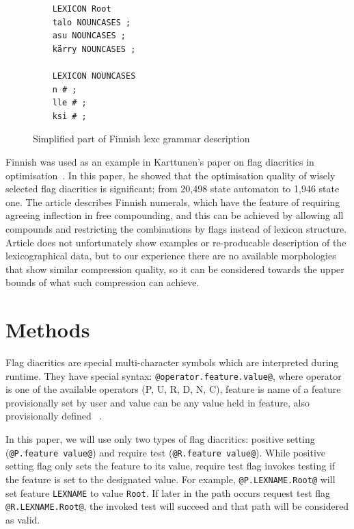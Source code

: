 \documentclass[11pt]{article}
\begin{document}
\begin{figure}
    \centering
    \begin{verbatim}
    LEXICON Root
    talo NOUNCASES ;
    asu NOUNCASES ;
    kärry NOUNCASES ;

    LEXICON NOUNCASES
    n # ;
    lle # ;
    ksi # ;
    \end{verbatim}
    \caption{Simplified part of Finnish lexc grammar description
    \label{fig:lexc-fin}}
\end{figure}

Finnish was used as an example in Karttunen's paper on flag diacritics in
optimisation~. In this paper, he showed that
the optimisation quality of wisely selected flag diacritics is significant;
from 20,498 state automaton to 1,946 state one. The article describes Finnish
numerals, which have the feature of requiring agreeing inflection in free
compounding, and this can be achieved by allowing all compounds and restricting
the combinations by flags instead of lexicon structure. Article does not
unfortunately show examples or re-producable description of the lexicographical
data, but to our experience there are no available morphologies that show
similar compression quality, so it can be considered towards the upper bounds
of what such compression can achieve.
 

\section{Methods}
\label{sec:methods}

Flag diacritics are special multi-character symbols which are interpreted during runtime. They have special syntax: \verb+@operator.feature.value@+, where operator is one of the available operators (P, U, R, D, N, C), feature is name of a feature provisionally set by user and value can be any value held in feature, also provisionally defined ~\cite{beesley2003finite}.

In this paper, we will use only two types of flag diacritics: positive setting (\verb+@P.feature value@+) and require test (\verb+@R.feature value@+). While positive setting flag only sets the feature to its value, require test flag invokes testing if the feature is set to the designated value.
For example, \verb+@P.LEXNAME.Root@+ will set feature \verb+LEXNAME+ to value \verb+Root+. If later in the path occurs request test flag \verb+@R.LEXNAME.Root@+, the invoked test will succeed and that path will be considered as valid. 
\end{document}
